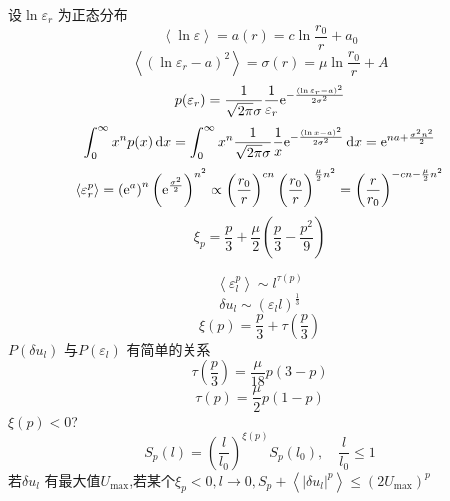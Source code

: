 \documentclass[12pt]{ctexart}
\begin{document}
设$\ln \varepsilon_r$ 为正态分布
\begin{equation}
   \left< \ln \varepsilon \right>  = a(r) = c \ln \frac{r_0}{r} + a_0
\end{equation}
\begin{equation}
   \left< \left( \ln \varepsilon_r - a \right) ^2 \right> = \sigma(r) = \mu \ln \frac{r_0}{r} + A
\end{equation}
\begin{equation}
   p(\varepsilon_r) = \frac{1}{\sqrt{2\pi} \sigma} \frac{1}{\varepsilon_r} \mathrm{e}^{-\frac{\left( \ln \varepsilon_r - a \right) ^2}{2\sigma^2}}
\end{equation}
\begin{equation}
   \int_{0}^{\infty} x^{n} p(x) \dif x = \int_{0}^{\infty} x^n \frac{1}{\sqrt{2\pi} \sigma} \frac{1}{x} \me^{-\frac{\left( \ln x - a \right) ^2}{2\sigma^2}} \dif x = \me^{na + \frac{\sigma^2n^2}{2}}
\end{equation}
\begin{equation}
   \left< \varepsilon_r^{p} \right> = \left( \mathrm{e}^{a} \right) ^{n} \left( \mathrm{e}^{\frac{\sigma^2}{2}} \right) ^{n^2} \propto \left( \frac{r_0}{r} \right)^{cn} \left( \frac{r_0}{r} \right)^{\frac{\mu}{2}n^2} = \left( \frac{r}{r_0} \right) ^{-cn - \frac{\mu}{2}n^2}
\end{equation}
\begin{equation}
   \xi_p = \frac{p}{3} + \frac{\mu}{2} \left( \frac{p}{3} - \frac{p^2}{9} \right) 
\end{equation}

\begin{equation}
   \left< \varepsilon_{l}^{p} \right> \sim l^{\tau (p)}
\end{equation}
\begin{equation}
   \delta u_{l} \sim \left( \varepsilon_l l \right) ^{\frac{1}{3}}
\end{equation}
\begin{equation}
   \xi(p) = \frac{p}{3} + \tau\left(\frac{p}{3}\right)
\end{equation}
$P(\delta u_l)$ 与$P(\varepsilon_l)$ 有简单的关系
\begin{equation}
   \tau \left( \frac{p}{3} \right) = \frac{\mu}{18} p (3-p)
\end{equation}
\begin{equation}
   \tau \left( p \right) = \frac{\mu}{2} p (1-p)
\end{equation}
$\xi(p)<0$?
\begin{equation}
   S_p (l) = \left( \frac{l}{l_0} \right) ^{\xi(p)} S_p (l_0), \quad \frac{l}{l_0} \le 1
\end{equation}
若$\delta u_l$ 有最大值$U_{\max}$,若某个$\xi_p < 0, l \to 0, S_p + \left< |\delta u_l |^p \right> \le  (2U_{\max})^p$
\end{document}
